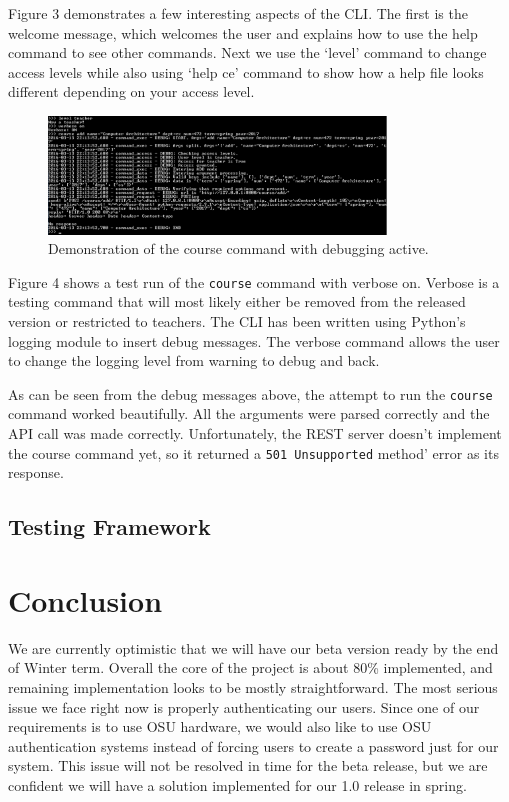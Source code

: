 \documentclass[10pt,draftclsnofoot,onecolumn]{IEEEtran}
\begin{document}
Figure 3 demonstrates a few interesting aspects of the CLI. The first is the
welcome message, which welcomes the user and explains how to use the help
command to see other commands. Next we use the ‘level’ command to change access
levels while also using ‘help ce’ command to show how a help file looks
different depending on your access level.

\begin{figure}[h]
\centering
\includegraphics[width=0.8\textwidth]{senior-project-screenshot-CLI-verbose-add-course}
\caption{Demonstration of the course command with debugging active.}
\end{figure}

Figure 4 shows a test run of the \texttt{course} command with verbose on.
Verbose is a testing command that will most likely either be removed from the
released version or restricted to teachers. The CLI has been written using
Python’s logging module to insert debug messages. The verbose command allows
the user to change the logging level from warning to debug and back.

As can be seen from the debug messages above, the attempt to run the
\texttt{course} command worked beautifully. All the arguments were parsed
correctly and the API call was made correctly. Unfortunately, the REST server
doesn’t implement the course command yet, so it returned a \texttt{501
Unsupported} method’ error as its response.

\subsection{Testing Framework}
\section{Conclusion}
We are currently optimistic that we will have our beta version ready by the end
of Winter term. Overall the core of the project is about 80\% implemented, and
remaining implementation looks to be mostly straightforward. The most serious
issue we face right now is properly authenticating our users. Since one of our
requirements is to use OSU hardware, we would also like to use OSU
authentication systems instead of forcing users to create a password just for
our system. This issue will not be resolved in time for the beta release, but
we are confident we will have a solution implemented for our 1.0 release in
spring.
\end{document}
